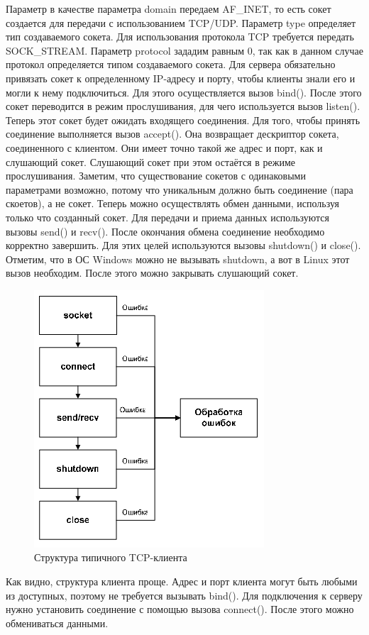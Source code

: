 \documentclass[a4paper]{article}
\begin{document}
Параметр в качестве параметра domain передаем AF\_INET, то есть сокет создается для передачи с использованием TCP/UDP. Параметр type определяет тип создаваемого сокета. Для использования протокола TCP требуется передать SOCK\_STREAM. Параметр protocol зададим равным 0, так как в данном случае протокол определяется типом создаваемого сокета. Для сервера обязательно привязать сокет к определенному IP-адресу и порту, чтобы клиенты знали его и могли к нему подключиться. Для этого осуществляется вызов bind(). После этого сокет переводится в режим прослушивания, для чего используется вызов listen(). Теперь этот сокет будет ожидать входящего соединения. Для того, чтобы принять соединение выполняется вызов accept(). Она возвращает дескриптор сокета, соединенного с клиентом. Они имеет точно такой же адрес и порт, как и слушающий сокет. Слушающий сокет при этом остаётся в режиме прослушивания. Заметим, что существование сокетов с одинаковыми параметрами возможно, потому что уникальным должно быть соединение (пара скоетов), а не сокет. Теперь можно осуществлять обмен данными, используя только что созданный сокет. Для передачи и приема данных используются вызовы send() и recv(). После окончания обмена соединение необходимо корректно завершить. Для этих целей используются вызовы shutdown()  и close(). Отметим, что в ОС Windows  можно не вызывать shutdown, а вот в Linux этот вызов необходим. После этого можно закрывать слушающий сокет.
\begin{figure}[H]
\begin{center}
\includegraphics[scale=0.7]{pics/ttcpc.png}
\caption{Структура типичного TCP-клиента}
\label{pic:ttcpc}
\end{center}
\end{figure}
Как видно, структура клиента проще. Адрес и порт клиента могут быть любыми из доступных, поэтому не требуется вызывать bind(). Для подключения к серверу нужно установить соединение с помощью вызова connect(). После этого можно обмениваться данными.
	
\end{document}
